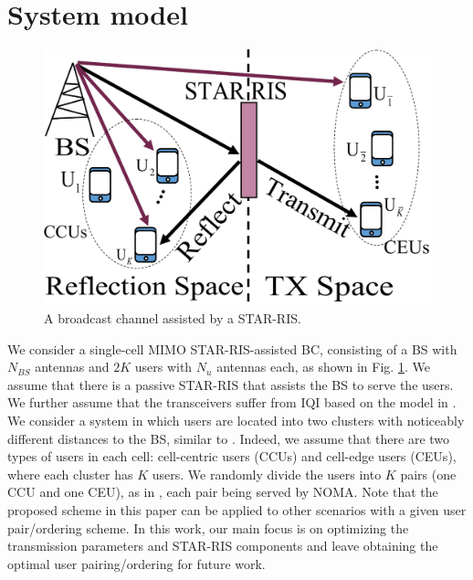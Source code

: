 \documentclass[a4, conference]{IEEEtran}
\theoremstyle{definition}
\begin{document}
\section{System model}\label{sec-ii}
\begin{figure}[t!]
    \centering
\includegraphics[width=.45\textwidth]{ST-RIS}
     \caption{A broadcast channel assisted by a STAR-RIS.}
	\label{Fig-sys-model}
\end{figure}
We consider a single-cell MIMO STAR-RIS-assisted BC, consisting of a BS with $N_{BS}$ antennas and $2K$ users with $N_u$ antennas  each, as shown in Fig. \ref{Fig-sys-model}. We assume that there is a passive STAR-RIS that assists the BS to serve the users.
We further assume that the transceivers suffer from IQI based on the model in \cite{javed2019multiple}. 
We consider a system in which users are located into two clusters with noticeably different distances to the BS, similar to \cite{tuan2019non}. Indeed, we assume that
there are two types of users in each cell: cell-centric  users (CCUs) and cell-edge  users (CEUs), where each cluster has $K$ users. 
We randomly divide the users into $K$ pairs (one CCU and one CEU), as in \cite{tuan2019non}, each pair being served by NOMA. 
Note that the proposed scheme in this paper can be applied to other scenarios with a given user pair/ordering scheme. In this work, our main focus is on optimizing the transmission parameters and STAR-RIS components and leave obtaining the optimal user pairing/ordering for future work.
\end{document}
